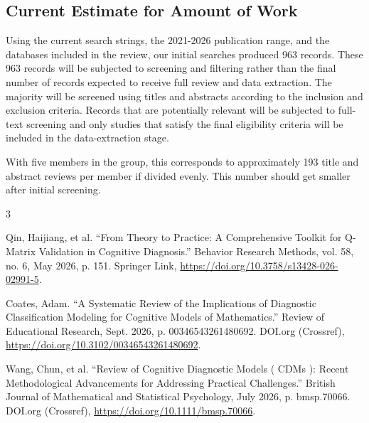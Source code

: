 \documentclass[sigconf,nonacm]{acmart}
\begin{document}
\subsection{Current Estimate for Amount of Work}

Using the current search strings, the 2021-2026 publication range, and the databases included in the review, our initial searches produced 963 records. These 963 records will be subjected to screening and filtering rather than the final number of records expected to receive full review and data extraction. The majority will be screened using titles and abstracts according to the inclusion and exclusion criteria. Records that are potentially relevant will be subjected to full-text screening and only studies that satisfy the final eligibility criteria will be included in the data-extraction stage.

With five members in the group, this corresponds to approximately 193 title and abstract reviews per member if divided evenly. This number should get smaller after initial screening.

\begin{thebibliography}{3}

Qin, Haijiang, et al. “From Theory to Practice: A Comprehensive Toolkit for Q-Matrix Validation in Cognitive Diagnosis.” Behavior Research Methods, vol. 58, no. 6, May 2026, p. 151. Springer Link, \href{https://doi.org/10.3758/s13428-026-02991-5}{https://doi.org/10.3758/s13428-026-02991-5}.

Coates, Adam. “A Systematic Review of the Implications of Diagnostic Classification Modeling for Cognitive Models of Mathematics.” Review of Educational Research, Sept. 2026, p. 00346543261480692. DOI.org (Crossref), \href{https://doi.org/10.3102/00346543261480692}{https://doi.org/10.3102/00346543261480692}.

Wang, Chun, et al. “Review of Cognitive Diagnostic Models ( CDMs ): Recent Methodological Advancements for Addressing Practical Challenges.” British Journal of Mathematical and Statistical Psychology, July 2026, p. bmsp.70066. DOI.org (Crossref), \href{https://doi.org/10.1111/bmsp.70066}{https://doi.org/10.1111/bmsp.70066}.

\end{thebibliography}
\end{document}
